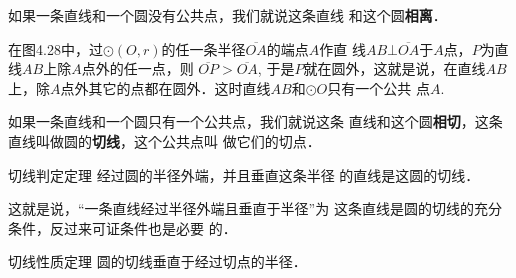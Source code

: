 如果一条直线和一个圆没有公共点，我们就说这条直线
和这个圆\textbf{相离}．

\begin{figure}[htp]\centering
    \begin{minipage}[t]{0.48\textwidth}
    \centering
    \caption{}
    \end{minipage}
    \begin{minipage}[t]{0.48\textwidth}
    \centering
    \caption{}
    \end{minipage}
    \end{figure}

在图4.28中，过$\odot (O,r)$的任一条半径$\overline{OA}$的端点$A$作直
线$AB\bot \overline{OA}$于$A$点，$P$为直线$AB$上除$A$点外的任一点，则
$\overline{OP}>\overline{OA}$, 于是$P$就在圆外，这就是说，在直线$AB$上，除$A$点外其它的点都在圆外．这时直线$AB$和$\odot O$只有一个公共
点$A$.

如果一条直线和一个圆只有一个公共点，我们就说这条
直线和这个圆\textbf{相切}，这条直线叫做圆的\textbf{切线}，这个公共点叫
做它们的切点．

\begin{blk}
    {切线判定定理} 经过圆的半径外端，并且垂直这条半径
的直线是这圆的切线．
\end{blk}

这就是说，“一条直线经过半径外端且垂直于半径”为
这条直线是圆的切线的充分条件，反过来可证条件也是必要
的．

\begin{blk}
    {切线性质定理} 圆的切线垂直于经过切点的半径．
\end{blk}

